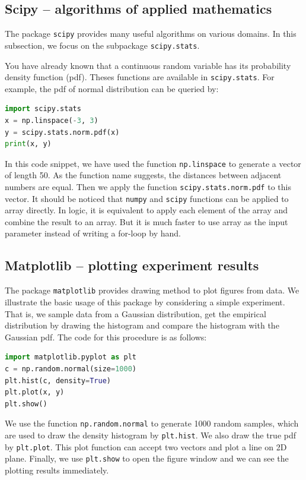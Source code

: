 \documentclass[10pt]{article}
\begin{document}
\subsection{Scipy -- algorithms of applied mathematics}
The package \texttt{scipy} provides many useful algorithms on various domains. In this subsection, we focus on the subpackage \texttt{scipy.stats}.

You have already known that a continuous random variable has
its probability density function (pdf). Theses functions are available in \texttt{scipy.stats}. For example,
the pdf of normal distribution can be queried by:
\begin{lstlisting}[language=Python,firstnumber=9]
import scipy.stats
x = np.linspace(-3, 3)
y = scipy.stats.norm.pdf(x)
print(x, y)
\end{lstlisting}
In this code snippet, we have used the function \texttt{np.linspace} to generate a vector of length 50.
As the function name suggests, the distances between adjacent numbers are equal. Then we apply the function \texttt{scipy.stats.norm.pdf} to this vector. It should be
noticed that \texttt{numpy} and \texttt{scipy} functions can
be applied to array directly. In logic, it is equivalent to apply
each element of the array and combine the result to an array.
But it is much faster to use array as the input parameter instead of writing a for-loop by hand.
\subsection{Matplotlib -- plotting experiment results}
The package \texttt{matplotlib} provides drawing method to
plot figures from data. We illustrate the basic usage of this
package by considering a simple experiment. That is,
we sample data from a Gaussian distribution, get the
empirical distribution by drawing the histogram and compare
the histogram with the Gaussian pdf. The code for this
procedure is as follows:
\begin{lstlisting}[language=Python,firstnumber=13]
import matplotlib.pyplot as plt
c = np.random.normal(size=1000)
plt.hist(c, density=True)
plt.plot(x, y)
plt.show()
\end{lstlisting}
We use the function \texttt{np.random.normal}
to generate 1000 random samples, which are used to draw the density histogram by \texttt{plt.hist}. We also
draw the true pdf by \texttt{plt.plot}. This plot function can accept two vectors and plot
a line on 2D plane. Finally, we use \texttt{plt.show} to open the figure window and we can see the plotting results immediately.
\end{document}
